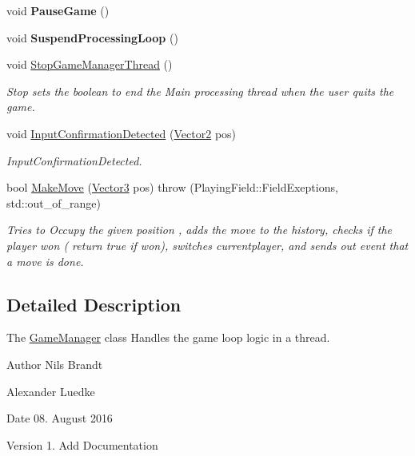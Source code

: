 \begin{DoxyCompactItemize}
\item 
\hypertarget{classGameManager_a6f108cd9cdd0cf101d19a151e5e76a26}{void {\bfseries Pause\-Game} ()}\label{classGameManager_a6f108cd9cdd0cf101d19a151e5e76a26}

\item 
\hypertarget{classGameManager_ac756f69d83f34849ed763c7de6b2d47f}{void {\bfseries Suspend\-Processing\-Loop} ()}\label{classGameManager_ac756f69d83f34849ed763c7de6b2d47f}

\item 
\hypertarget{classGameManager_a4e3d2ab486b782641640fb82b77963f2}{void \hyperlink{classGameManager_a4e3d2ab486b782641640fb82b77963f2}{Stop\-Game\-Manager\-Thread} ()}\label{classGameManager_a4e3d2ab486b782641640fb82b77963f2}

\begin{DoxyCompactList}\small\item\em Stop sets the boolean to end the Main processing thread when the user quits the game. \end{DoxyCompactList}\item 
void \hyperlink{classGameManager_ade855b10bc61465dfdfb458cf624cf97}{Input\-Confirmation\-Detected} (\hyperlink{structVector2}{Vector2} pos)
\begin{DoxyCompactList}\small\item\em Input\-Confirmation\-Detected. \end{DoxyCompactList}\item 
bool \hyperlink{classGameManager_ab5e866fc01d4d612cd1f84de0df4653f}{Make\-Move} (\hyperlink{structVector3}{Vector3} pos)  throw (\-Playing\-Field\-::\-Field\-Exeptions, std\-::out\-\_\-of\-\_\-range)
\begin{DoxyCompactList}\small\item\em Tries to Occupy the given position , adds the move to the history, checks if the player won ( return true if won), switches currentplayer, and sends out event that a move is done. \end{DoxyCompactList}\end{DoxyCompactItemize}


\subsection{Detailed Description}
The \hyperlink{classGameManager}{Game\-Manager} class Handles the game loop logic in a thread. 

\begin{DoxyAuthor}{Author}
Nils Brandt 

Alexander Luedke
\end{DoxyAuthor}
\begin{DoxyDate}{Date}
08. August 2016
\end{DoxyDate}
\begin{DoxyVersion}{Version}
1. Add Documentation 
\end{DoxyVersion}


